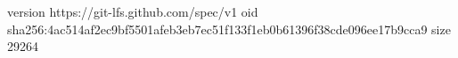 version https://git-lfs.github.com/spec/v1
oid sha256:4ac514af2ec9bf5501afeb3eb7ec51f133f1eb0b61396f38cde096ee17b9cca9
size 29264
